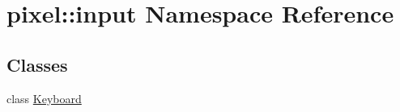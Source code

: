 \hypertarget{namespacepixel_1_1input}{}\section{pixel\+:\+:input Namespace Reference}
\label{namespacepixel_1_1input}
\subsection*{Classes}
\begin{DoxyCompactItemize}
\item 
class \hyperlink{classpixel_1_1input_1_1_keyboard}{Keyboard}
\end{DoxyCompactItemize}

